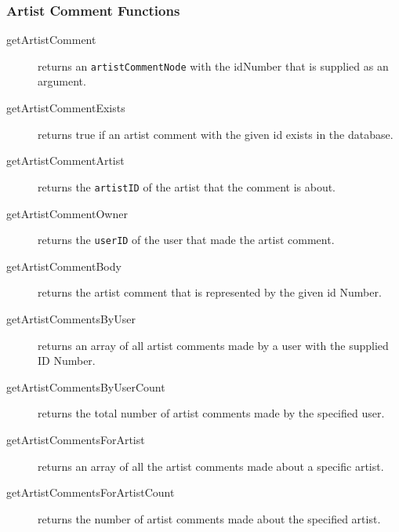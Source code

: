 \documentclass{article}
\begin{document}
\subsubsection{Artist Comment Functions}
\begin{description}
\item[getArtistComment] returns an \verb|artistCommentNode| with the idNumber that is supplied as an argument. 
\item[getArtistCommentExists] returns true if an artist comment with the given id exists in the database.
\item[getArtistCommentArtist] returns the \verb|artistID| of the artist that the comment is about.
\item[getArtistCommentOwner] returns the \verb|userID| of the user that made the artist comment.
\item[getArtistCommentBody] returns the artist comment that is represented by the given id Number.
\item[getArtistCommentsByUser] returns an array of all artist comments made by a user with the supplied ID Number.
\item[getArtistCommentsByUserCount] returns the total number of artist comments made by the specified user.
\item[getArtistCommentsForArtist] returns an array of all the artist comments made about a specific artist.
\item[getArtistCommentsForArtistCount] returns the number of artist comments made about the specified artist.
\end{description}
\end{document}
